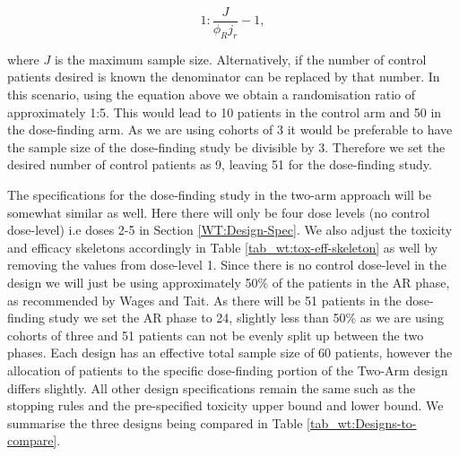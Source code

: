 \begin{equation}
	1 : \frac{J}{\phi_R j_r} - 1,
\end{equation}

where $J$ is the maximum sample size. Alternatively, if the number of control patients desired is known the denominator can be replaced by that number. In this scenario, using the equation above we obtain a randomisation ratio of approximately 1:5. This would lead to 10 patients in the control arm and 50 in the dose-finding arm. As we are using cohorts of 3 it would be preferable to have the sample size of the dose-finding study be divisible by 3. Therefore we set the desired number of control patients as 9, leaving 51 for the dose-finding study.

The specifications for the dose-finding study in the two-arm approach will be somewhat similar as well. Here there will only be four dose levels (no control dose-level) i.e doses 2-5 in Section \ref{WT:Design-Spec}. We also adjust the toxicity and efficacy skeletons accordingly in Table \ref{tab_wt:tox-eff-skeleton} as well by removing the values from dose-level 1. Since there is no control dose-level in the design we will just be using approximately 50\% of the patients in the AR phase, as recommended by Wages and Tait. As there will be 51 patients in the dose-finding study we set the AR phase to 24, slightly less than 50\% as we are using cohorts of three and 51 patients can not be evenly split up between the two phases. Each design has an effective total sample size of 60 patients, however the allocation of patients to the specific dose-finding portion of the Two-Arm design differs slightly. All other design specifications remain the same such as the stopping rules and the pre-specified toxicity upper bound and lower bound. We summarise the three designs being compared in Table \ref{tab_wt:Designs-to-compare}.

